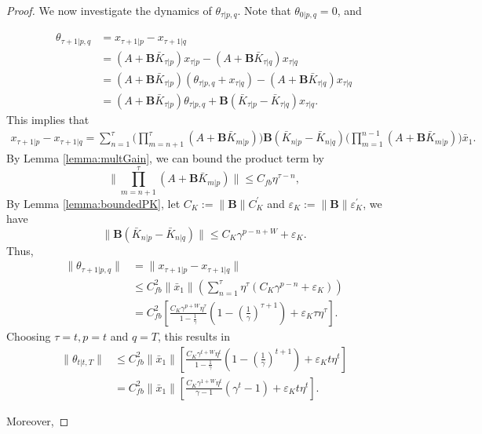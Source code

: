 \documentclass{article}
\newcommand{\BK}[1]{\mathbf{B}\bar{K}_{#1}}
\begin{document}
\begin{proof}
We now investigate the dynamics of $\theta_{\tau|p,q}$. Note that $\theta_{0|p,q} = 0$, and 

\begin{align*}
    \theta_{\tau+1|p,q} &= x_{\tau+1|p} - x_{\tau+1|q}\\
    &= (A+\BK{\tau|p})x_{\tau|p}-(A+\BK{\tau|q})x_{\tau|q}\\
    &= (A+\BK{\tau|p})(\theta_{\tau|p,q}+x_{\tau|q})-(A+\BK{\tau|q})x_{\tau|q}\\
    &= (A+\BK{\tau|p})\theta_{\tau|p,q} + \mathbf{B}(\bar{K}_{\tau|p}-\bar{K}_{\tau|q})x_{\tau|q}.
\end{align*}
This implies that
\begin{align*}
    x_{\tau+1|p} - x_{\tau+1|q} = \sum_{n=1}^{\tau}\bigg(\prod_{m=n+1}^{\tau}(A+\BK{m|p})\bigg)\mathbf{B}(\bar{K}_{n|p}-\bar{K}_{n|q})\bigg(\prod_{m=1}^{n-1}(A+\BK{m|p})\bigg)\bar{x}_{1}.
\end{align*}
By Lemma \ref{lemma:multGain}, we can bound the product term by
\begin{equation*}
    \| \prod_{m=n+1}^{\tau}(A+\BK{m|p})\| \leq C_{fb}\eta^{\tau-n},
\end{equation*}
By Lemma \ref{lemma:boundedPK}, let $C_{K} := \|\mathbf{B}\|C_{K}^{'}$ and $\varepsilon_{K} := \|\mathbf{B}\|\varepsilon_{K}^{'}$, we have
\begin{equation*}
    \|\mathbf{B}(\bar{K}_{n|p}-\bar{K}_{n|q})\| \leq C_{K}\gamma^{p-n+W}+\varepsilon_{K}.
\end{equation*}
Thus,
\begin{align*}
    \|\theta_{\tau+1|p,q}\| &= \|x_{\tau+1|p}-x_{\tau+1|q}\|\\
    &\leq C_{fb}^{2}\|\bar{x}_{1}\|(\sum_{n=1}^{\tau}\eta^{\tau}(C_{K}\gamma^{p-n}+\varepsilon_{K}))\\
    &= C_{fb}^{2}[\frac{C_{K}\gamma^{p+W}\eta^{\tau}}{1-\frac{1}{\gamma}}(1-(\frac{1}{\gamma})^{\tau+1})+ \varepsilon_{K}\tau\eta^{\tau}].
\end{align*}
Choosing $\tau = t,p = t$ and $q = T$, this results in
\begin{align*}
    \|\theta_{t|t,T}\| &\leq C^{2}_{fb}\|\bar{x}_{1}\|[\frac{C_{K}\gamma^{t+W}\eta^{t}}{1-\frac{1}{\gamma}}(1-(\frac{1}{\gamma})^{t+1}) + \varepsilon_{K}t\eta^{t}]\\
    &= C^{2}_{fb}\|\bar{x}_{1}\|[\frac{C_{K}\gamma^{1+W}\eta^{t}}{\gamma-1}(\gamma^{t}-1) + \varepsilon_{K}t\eta^{t}].
\end{align*}

Moreover,


\end{proof}
\end{document}
